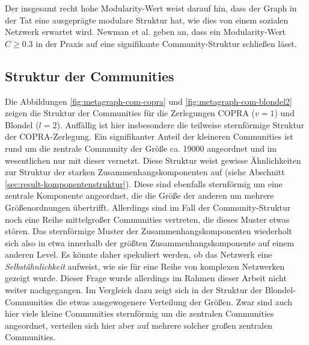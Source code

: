 Der insgesamt recht hohe Modularity-Wert weist darauf hin, dass der
Graph in der Tat eine ausgeprägte modulare Struktur hat, wie dies
von einem sozialen Netzwerk erwartet wird. Newman et al. geben an,
dass ein Modularity-Wert $C \ge 0.3$ in der Praxis auf eine
signifikante Community-Struktur schließen lässt\cite{Clauset2004}.

\subsection{Struktur der Communities}
\label{sec:strukt-der-comm}

Die Abbildungen \ref{fig:metagraph-com-copra} und
\ref{fig:metagraph-com-blondel2} zeigen die Struktur der Communities
für die Zerlegungen COPRA ($v=1$) und Blondel ($l=2$). Auffällig
ist hier insbesondere die teilweise sternförmige Struktur der
COPRA-Zerlegung. Ein signifikanter Anteil der kleineren Communities
ist rund um die zentrale Community der Größe ca. 19000 angeordnet
und im wesentlichen nur mit dieser vernetzt. Diese Struktur weist
gewisse Ähnlichkeiten zur Struktur der starken
Zusammenhangskomponenten auf (siehe Abschnitt
\ref{sec:result-komponentenstruktur}). Diese sind ebenfalls
sternförmig um eine zentrale Komponente angeordnet, die die Größe
der anderen um mehrere Größenordnungen übertrifft. Allerdings
sind im Fall der Community-Struktur noch eine Reihe mittelgroßer
Communities vertreten, die dieses Muster etwas stören. Das
sternförmige Muster der Zusammenhangskomponenten wiederholt sich
also in etwa innerhalb der größten Zusammenhangskomponente auf
einem anderen Level. Es könnte daher spekuliert werden, ob das
Netzwerk eine \emph{Selbstähnlichkeit} aufweist, wie sie für eine
Reihe von komplexen Netzwerken gezeigt wurde\cite{Song2005}. Dieser
Frage wurde allerdings im Rahmen dieser Arbeit nicht weiter
nachgegangen. Im Vergleich dazu zeigt sich in der Struktur der
Blondel-Communities die etwas ausgewogenere Verteilung der Größen. Zwar
sind auch hier viele kleine Communities sternförmig um die zentralen
Communities angeordnet, verteilen sich hier aber auf mehrere solcher
großen zentralen Communities.

